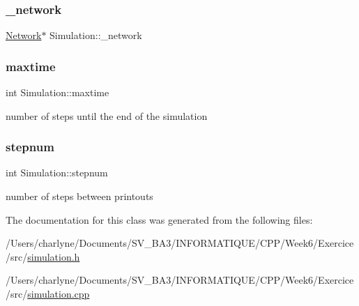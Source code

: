 \subsubsection{\texorpdfstring{\+\_\+network}{\_network}}
{\footnotesize\ttfamily \mbox{\hyperlink{classNetwork}{Network}}$\ast$ Simulation\+::\+\_\+network\hspace{0.3cm}{\ttfamily [private]}}

\mbox{\label{classSimulation_a2db45338d73f8e7823eb85015532be23}} 
\subsubsection{\texorpdfstring{maxtime}{maxtime}}
{\footnotesize\ttfamily int Simulation\+::maxtime\hspace{0.3cm}{\ttfamily [private]}}

number of steps until the end of the simulation \mbox{\label{classSimulation_a6bfba2071d6358af042ca417637c6c36}} 
\subsubsection{\texorpdfstring{stepnum}{stepnum}}
{\footnotesize\ttfamily int Simulation\+::stepnum\hspace{0.3cm}{\ttfamily [private]}}

number of steps between printouts 

The documentation for this class was generated from the following files\+:\begin{DoxyCompactItemize}
\item 
/\+Users/charlyne/\+Documents/\+S\+V\+\_\+\+B\+A3/\+I\+N\+F\+O\+R\+M\+A\+T\+I\+Q\+U\+E/\+C\+P\+P/\+Week6/\+Exercice/src/\mbox{\hyperlink{simulation_8h}{simulation.\+h}}\item 
/\+Users/charlyne/\+Documents/\+S\+V\+\_\+\+B\+A3/\+I\+N\+F\+O\+R\+M\+A\+T\+I\+Q\+U\+E/\+C\+P\+P/\+Week6/\+Exercice/src/\mbox{\hyperlink{simulation_8cpp}{simulation.\+cpp}}\end{DoxyCompactItemize}
